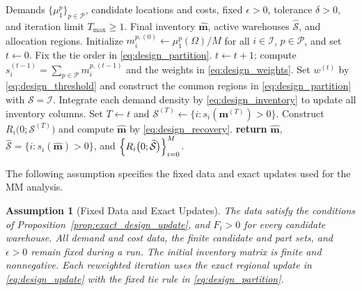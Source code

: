 \documentclass[a4paper,fleqn]{cas-sc}
\newtheorem{assumption}{Assumption}
\theoremstyle{remark}
\theoremstyle{plain}
\begin{document}
\begin{algorithm}[H]
\caption{Reweighted $\ell_1$ Minimization for Sparse Network Design}
\label{alg:sparse_network}
\begin{algorithmic}[1]
    \REQUIRE Demands $\{\mu_1^p\}_{p\in\mathcal P}$, candidate locations and costs, fixed $\epsilon>0$, tolerance $\delta>0$, and iteration limit $T_{\max}\ge1$.
    \ENSURE Final inventory $\hat{\mathbf m}$, active warehouses $\widehat{\mathcal S}$, and allocation regions.
    \STATE Initialize $m_i^{p,(0)}\leftarrow\mu_1^p(\Omega)/M$ for all $i\in\mathcal I$, $p\in\mathcal P$, and set $t\leftarrow0$.
    \STATE Fix the tie order in \eqref{eq:design_partition}.
    \REPEAT
        \STATE $t\leftarrow t+1$; compute $s_i^{(t-1)}=\sum_{p\in\mathcal P}m_i^{p,(t-1)}$ and the weights in \eqref{eq:design_weights}.
        \STATE Set $w^{(t)}$ by \eqref{eq:design_threshold} and construct the common regions in \eqref{eq:design_partition} with $\mathcal S=\mathcal I$.
        \STATE Integrate each demand density by \eqref{eq:design_inventory} to update all inventory columns.
    \STATE Set $T\leftarrow t$ and $\mathcal S^{(T)}\leftarrow\bigl\{i:s_i(\mathbf m^{(T)})>0\bigr\}$.
    \STATE Construct $R_i\bigl(0;\mathcal S^{(T)}\bigr)$ and compute $\hat{\mathbf m}$ by \eqref{eq:design_recovery}.
    \STATE \textbf{return} $\hat{\mathbf m}$, $\widehat{\mathcal S}=\bigl\{i:s_i(\hat{\mathbf m})>0\bigr\}$, and $\Bigl\{R_i\bigl(0;\widehat{\mathcal S}\bigr)\Bigr\}_{i=0}^M$.
\end{algorithmic}
\end{algorithm}

The following assumption specifies the fixed data and exact updates used for the MM analysis.

\begin{assumption}[Fixed Data and Exact Updates]
\label{ass:design_convergence}
The data satisfy the conditions of Proposition~\ref{prop:exact_design_update}, and $F_i>0$ for every candidate warehouse. All demand and cost data, the finite candidate and part sets, and $\epsilon>0$ remain fixed during a run. The initial inventory matrix is finite and nonnegative. Each reweighted iteration uses the exact regional update in \eqref{eq:design_update} with the fixed tie rule in \eqref{eq:design_partition}.
\end{assumption}
\end{document}
